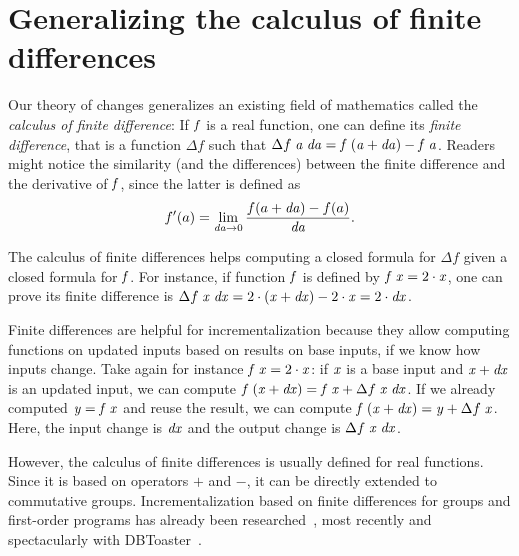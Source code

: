 \section{Generalizing the calculus of finite differences}
\label{sec:generalize-fin-diff}
Our theory of changes generalizes an existing field of mathematics called
the \emph{calculus of finite difference}: If \ensuremath{\Varid{f}} is a real
function, one can define its \emph{finite difference}, that is a
function \ensuremath{\Delta f} such that \ensuremath{\Delta f\;\Varid{a}\;\Varid{da}\mathrel{=}\Varid{f}\;(\Varid{a}\mathbin{+}\Varid{da})\mathbin{-}\Varid{f}\;\Varid{a}}. Readers
might notice the similarity (and the differences) between the
finite difference and the derivative of \ensuremath{\Varid{f}}, since the latter is
defined as
\[f'(a) = \lim_{\mathit{da} \to 0} \frac{f (a + \mathit{da}) - f(a)}{\mathit{da}}.\]

The calculus of finite differences helps computing a closed
formula for \ensuremath{\Delta f} given a closed formula for \ensuremath{\Varid{f}}. For instance,
if function \ensuremath{\Varid{f}} is defined by \ensuremath{\Varid{f}\;\Varid{x}\mathrel{=}\mathrm{2}\cdot\Varid{x}}, one can prove
its finite difference is \ensuremath{\Delta f\;\Varid{x}\;\Varid{dx}\mathrel{=}\mathrm{2}\cdot(\Varid{x}\mathbin{+}\Varid{dx})\mathbin{-}\mathrm{2}\cdot\Varid{x}\mathrel{=}\mathrm{2}\cdot\Varid{dx}}.

Finite differences are helpful for incrementalization because
they allow computing functions on updated inputs based on results
on base inputs, if we know how inputs change. Take again for
instance \ensuremath{\Varid{f}\;\Varid{x}\mathrel{=}\mathrm{2}\cdot\Varid{x}}: if \ensuremath{\Varid{x}} is a base input and \ensuremath{\Varid{x}\mathbin{+}\Varid{dx}}
is an updated input, we can compute \ensuremath{\Varid{f}\;(\Varid{x}\mathbin{+}\Varid{dx})\mathrel{=}\Varid{f}\;\Varid{x}\mathbin{+}\Delta f\;\Varid{x}\;\Varid{dx}}. If we already computed \ensuremath{\Varid{y}\mathrel{=}\Varid{f}\;\Varid{x}} and reuse the result, we
can compute \ensuremath{\Varid{f}\;(\Varid{x}\mathbin{+}\Varid{dx})\mathrel{=}\Varid{y}\mathbin{+}\Delta f\;\Varid{x}}. Here, the input change is
\ensuremath{\Varid{dx}} and the output change is \ensuremath{\Delta f\;\Varid{x}\;\Varid{dx}}.

However, the calculus of finite differences is usually defined
for real functions. Since it is based on operators \ensuremath{\mathbin{+}} and \ensuremath{\mathbin{-}},
it can be directly extended to commutative groups.
Incrementalization based on finite differences for groups and
first-order programs has already been
researched~\citep{Paige82FDC,GlucheGrust97Incr}, most recently and
spectacularly with DBToaster~\citep{Koch10IQE,Koch2016incremental}.

